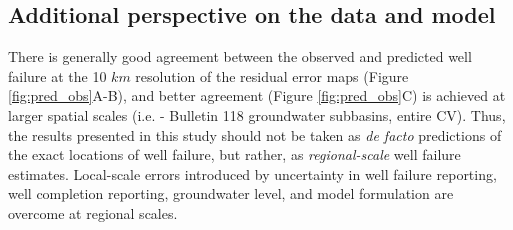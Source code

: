 \subsection{Additional perspective on the data and model}


There is generally good agreement between the observed and predicted well failure at the 10 $km$ resolution of the residual error maps (Figure \ref{fig:pred_obs}A-B), and better agreement (Figure \ref{fig:pred_obs}C) is achieved at larger spatial scales (i.e. - Bulletin 118 groundwater subbasins, entire CV). Thus, the results presented in this study should not be taken as \textit{de facto} predictions of the exact locations of well failure, but rather, as \textit{regional-scale} well failure estimates. Local-scale errors introduced by uncertainty in well failure reporting, well completion reporting, groundwater level, and model formulation are overcome at regional scales. 

